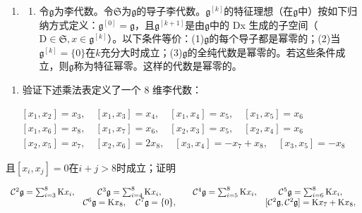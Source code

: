 \begin{enumerate}
\def\labelenumi{\arabic{enumi}.}
\setcounter{enumi}{18}
\tightlist
\item
  \begin{enumerate}
  \def\labelenumii{(\alph{enumii})}
  \tightlist
  \item
    令\(\mathfrak{g}\)为李代数。令\(\mathfrak{S}\)为\(\mathfrak{g}\)的导子李代数。\(\mathfrak{g}^{[k]}\)的特征理想（在\(\mathfrak{g}\)中）按如下归纳方式定义：\(\mathfrak{g}^{[0]} = \mathfrak{g}\)，且\(\mathfrak{g}^{[k+1]}\)是由\(\mathfrak{g}\)中的 Dx 生成的子空间（\(\mathrm{D} \in \mathfrak{S}, x \in \mathfrak{g}^{[k]}\)）。以下条件等价：(1)\(\mathfrak{g}\)的每个导子都是幂零的；(2)当\(\mathfrak{g}^{[k]} = \{0\}\)在\(k\)充分大时成立；(3)\(\mathfrak{g}\)的全纯代数是幂零的。若这些条件成立，则\(\mathfrak{g}\)称为特征幂零。这样的代数是幂零的。
  \end{enumerate}
\end{enumerate}

\begin{enumerate}
\def\labelenumi{(\alph{enumi})}
\setcounter{enumi}{1}
\tightlist
\item
  验证下述乘法表定义了一个 8 维李代数：
\end{enumerate}

\[
\begin{array}{r} \left[ x _ {1}, x _ {2} \right] = x _ {3}, \quad \left[ x _ {1}, x _ {3} \right] = x _ {4}, \quad \left[ x _ {1}, x _ {4} \right] = x _ {5}, \quad \left[ x _ {1}, x _ {5} \right] = x _ {6} \\ \left[ x _ {1}, x _ {6} \right] = x _ {8}, \quad \left[ x _ {1}, x _ {7} \right] = x _ {6}, \quad \left[ x _ {2}, x _ {3} \right] = x _ {5}, \quad \left[ x _ {2}, x _ {4} \right] = x _ {6} \\ \left[ x _ {2}, x _ {5} \right] = x _ {7}, \quad \left[ x _ {2}, x _ {6} \right] = 2 x _ {8}, \quad \left[ x _ {3}, x _ {4} \right] = - x _ {7} + x _ {8}, \quad \left[ x _ {3}, x _ {5} \right] = - x _ {8} \end{array}
\]

且\([x_i, x_j] = 0\)在\(i + j > 8\)时成立；证明

\[
\begin{array}{c c} \mathcal {C} ^ {2} \mathfrak {g} = \sum_ {i = 3} ^ {8} \mathrm{K} x _ {i}, & \mathcal {C} ^ {3} \mathfrak {g} = \sum_ {i = 4} ^ {8} \mathrm{K} x _ {i}, \\ & \mathcal {C} ^ {6} \mathfrak {g} = \mathrm{K} x _ {8}, \quad \mathcal {C} ^ {7} \mathfrak {g} = \{0 \}, \end{array} \quad \begin{array}{c c} \mathcal {C} ^ {4} \mathfrak {g} = \sum_ {i = 5} ^ {8} \mathrm{K} x _ {i}, & \mathcal {C} ^ {5} \mathfrak {g} = \sum_ {i = 6} ^ {8} \mathrm{K} x _ {i}, \\ & [ \mathcal {C} ^ {2} \mathfrak {g}, \mathcal {C} ^ {2} \mathfrak {g} ] = \mathrm{K} x _ {7} + \mathrm{K} x _ {8}, \end{array}
\]

